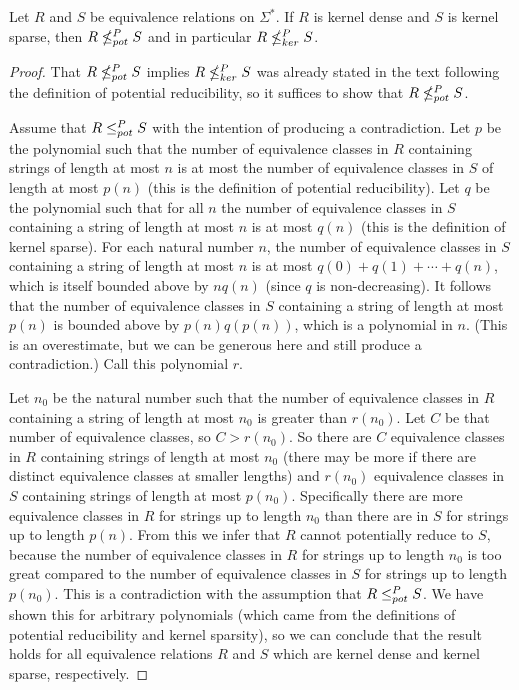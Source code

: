\begin{theorem}\label{prop:density}
  Let $R$ and $S$ be equivalence relations on $\Sigma^*$.
  If $R$ is kernel dense and $S$ is kernel sparse, then $R\nleq^{P}_{pot} S$ and in particular $R\nleq^{P}_{ker} S$.
\end{theorem}
\begin{proof}
  That $R\nleq^{P}_{pot} S$ implies $R\nleq^{P}_{ker} S$ was already stated in the text following the definition of potential reducibility, so it suffices to show that $R\nleq^{P}_{pot} S$.

  Assume that $R\leq^{P}_{pot} S$ with the intention of producing a contradiction.
  Let $p$ be the polynomial such that the number of equivalence classes in $R$ containing strings of length at most $n$ is at most the number of equivalence classes in $S$ of length at most $p(n)$ (this is the definition of potential reducibility).
  Let $q$ be the polynomial such that for all $n$ the number of equivalence classes in $S$ containing a string of length at most $n$ is at most $q(n)$ (this is the definition of kernel sparse).
  For each natural number $n$, the number of equivalence classes in $S$ containing a string of length at most $n$ is at most $q(0) + q(1) + \cdots + q(n)$, which is itself bounded above by $nq(n)$ (since $q$ is non-decreasing).
  It follows that the number of equivalence classes in $S$ containing a string of length at most $p(n)$ is bounded above by $p(n)q(p(n))$, which is a polynomial in $n$.
  (This is an overestimate, but we can be generous here and still produce a contradiction.)
  Call this polynomial $r$.

  Let $n_0$ be the natural number such that the number of equivalence classes in $R$ containing a string of length at most $n_0$ is greater than $r(n_0)$.
  Let $C$ be that number of equivalence classes, so $C>r(n_0)$.
  So there are $C$ equivalence classes in $R$ containing strings of length at most $n_0$ (there may be more if there are distinct equivalence classes at smaller lengths) and $r(n_0)$ equivalence classes in $S$ containing strings of length at most $p(n_0)$.
  Specifically there are more equivalence classes in $R$ for strings up to length $n_0$ than there are in $S$ for strings up to length $p(n)$.
  From this we infer that $R$ cannot potentially reduce to $S$, because the number of equivalence classes in $R$ for strings up to length $n_0$ is too great compared to the number of equivalence classes in $S$ for strings up to length $p(n_0)$.
  This is a contradiction with the assumption that $R\leq^{P}_{pot} S$.
  We have shown this for arbitrary polynomials (which came from the definitions of potential reducibility and kernel sparsity), so we can conclude that the result holds for all equivalence relations $R$ and $S$ which are kernel dense and kernel sparse, respectively.
\end{proof}

